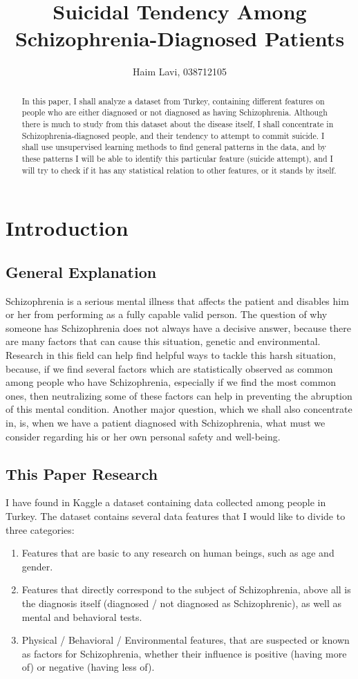 \documentclass{article}
\title{Suicidal Tendency Among Schizophrenia-Diagnosed Patients}
\author{Haim Lavi, 038712105}
\begin{document}
\maketitle

\begin{abstract}
In this paper, I shall analyze a dataset from Turkey, containing different features on people who are either diagnosed or not diagnosed as having Schizophrenia. Although there is much to study from this dataset about the disease itself, I shall concentrate in Schizophrenia-diagnosed people, and their tendency to attempt to commit suicide. I shall use unsupervised learning methods to find general patterns in the data, and by these patterns I will be able to identify this particular feature (suicide attempt), and I will try to check if it has any statistical relation to other features, or it stands by itself.
\end{abstract}

\section{Introduction}
\subsection{General Explanation}
Schizophrenia is a serious mental illness that affects the patient and disables him or her from performing as a fully capable valid person. The question of why someone has Schizophrenia does not always have a decisive answer, because there are many factors that can cause this situation, genetic and environmental. Research in this field can help find helpful ways to tackle this harsh situation, because, if we find several factors which are statistically observed as common among people who have Schizophrenia, especially if we find the most common ones, then neutralizing some of these factors can help in preventing the abruption of this mental condition. Another major question, which we shall also concentrate in, is, when we have a patient diagnosed with Schizophrenia, what must we consider regarding his or her own personal safety and well-being.
\subsection{This Paper Research}
I have found in Kaggle a dataset containing data collected among people in Turkey. The dataset contains several data features that I would like to divide to three categories:
\begin{enumerate}
    \item Features that are basic to any research on human beings, such as age and gender.
    \item Features that directly correspond to the subject of Schizophrenia, above all is the diagnosis itself (diagnosed / not diagnosed as Schizophrenic), as well as mental and behavioral tests.
    \item Physical / Behavioral / Environmental features, that are suspected or known as factors for Schizophrenia, whether their influence is positive (having more of) or negative (having less of).
\end{enumerate}
\end{document}
